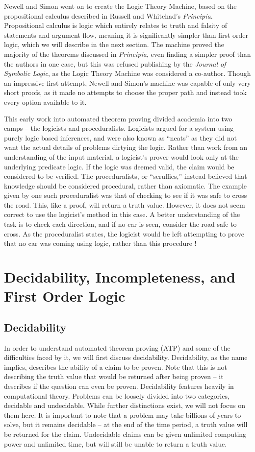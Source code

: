 Newell and Simon went on to create the Logic Theory Machine, based on the propositional calculus described in Russell and Whitehad's \textit{Principia}. Propositional calculus is logic which entirely relates to truth and falsity of statements and argument flow, meaning it is significantly simpler than first order logic, which we will describe in the next section. The machine proved the majority of the theorems discussed in \textit{Principia}, even finding a simpler proof than the authors in one case, but this was refused publishing by the \textit{Journal of Symbolic Logic}, as the Logic Theory Machine was considered a co-author. Though an impressive first attempt, Newell and Simon's machine was capable of only very short proofs, as it made no attempts to choose the proper path and instead took every option available to it.

This early work into automated theorem proving divided academia into two camps -- the logicists and proceduralists. Logicists argued for a system using purely logic based inferences, and were also known as ``neats'' as they did not want the actual details of problems dirtying the logic. Rather than work from an understanding of the input material, a logicist's prover would look only at the underlying predicate logic. If the logic was deemed valid, the claim would be considered to be verified. The proceduralists, or ``scruffies,'' instead believed that knowledge should be considered procedural, rather than axiomatic. The example given by one such proceduralist was that of checking to see if it was safe to cross the road. This, like a proof, will return a truth value. However, it does not seem correct to use the logicist's method in this case. A better understanding of the task is to check each direction, and if no car is seen, consider the road safe to cross. As the proceduralist states, the logicist would be left attempting to prove that no car was coming using logic, rather than this procedure \cite{history}!

\section{Decidability, Incompleteness, and First Order Logic}
\subsection{Decidability}\label{turingMachine}
In order to understand automated theorem proving (ATP) and some of the difficulties faced by it, we will first discuss decidability. Decidability, as the name implies, describes the ability of a claim to be proven. Note that this is not describing the truth value that would be returned after being proven -- it describes if the question can even be proven. 
Decidability features heavily in computational theory. Problems can be loosely divided into two categories, decidable and undecidable. While further distinctions exist, we will not focus on them here. It is important to note that a problem may take billions of years to solve, but it remains decidable -- at the end of the time period, a truth value will be returned for the claim. Undecidable claims can be given unlimited computing power and unlimited time, but will still be unable to return a truth value.

